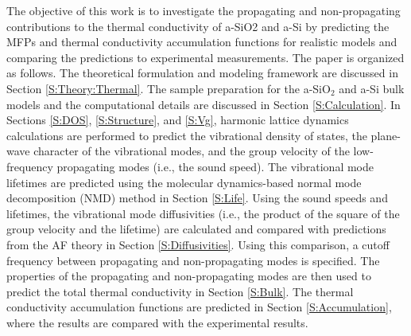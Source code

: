 \documentclass[aps,prb,onecolumn,preprint,superscriptaddress,footinbib,amsmath,amssymb,floatfix]{revtex4}
\begin{document}
The objective of this work is to investigate the propagating 
and non-propagating contributions to the thermal conductivity 
of a-SiO2 and a-Si   
by predicting the MFPs and thermal conductivity 
accumulation functions for realistic models and comparing the 
predictions to experimental measurements. 
The paper is organized as follows. 
The theoretical formulation and modeling framework are 
discussed in Section \ref{S:Theory:Thermal}. The sample preparation 
for the a-SiO$_2$ and a-Si bulk models and the computational details 
are discussed in Section \ref{S:Calculation}. 
In Sections \ref{S:DOS}, \ref{S:Structure}, and \ref{S:Vg}, 
harmonic lattice dynamics calculations 
are performed to predict the vibrational density of 
states, the plane-wave character of the vibrational modes, and  
the group velocity of the low-frequency propagating modes (i.e., 
the sound speed). 
The vibrational mode lifetimes are predicted using the
molecular dynamics-based normal 
mode decomposition (NMD) method in Section \ref{S:Life}. 
Using the sound speeds and lifetimes, the vibrational 
mode diffusivities (i.e., the product of the square of 
the group velocity and the lifetime) are calculated and compared 
with predictions from the AF theory in Section \ref{S:Diffusivities}. 
Using this comparison, a cutoff frequency between propagating and 
non-propagating modes is specified. 
The properties of the propagating and non-propagating 
modes are then used to predict the total thermal 
conductivity in Section \ref{S:Bulk}. 
The thermal conductivity accumulation functions 
are predicted in Section \ref{S:Accumulation}, 
where the results are compared with the experimental results. 

\end{document}
